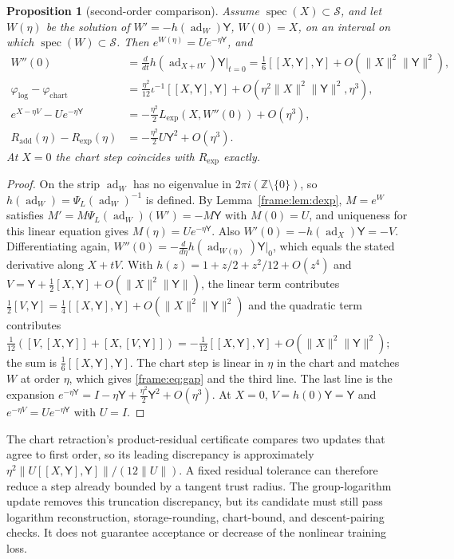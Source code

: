 \documentclass[11pt]{article}
\newtheorem{proposition}[theorem]{Proposition}
\theoremstyle{definition}
\theoremstyle{remark}
\providecommand{\ad}{\operatorname{ad}}
\providecommand{\spec}{\operatorname{spec}}
\begin{document}
\begin{proposition}[second-order comparison]\label{frame:prop:second}
Assume $\spec(X)\subset\mathcal{S}$, and let $W(\eta)$ be the solution of $W'=-h(\ad_W)\mathsf{Y}$, $W(0)=X$, on an interval on which $\spec(W)\subset\mathcal{S}$. Then $e^{W(\eta)}=Ue^{-\eta\mathsf{Y}}$, and
\begin{align}
W''(0)&=\frac{d}{dt}h(\ad_{X+tV})\mathsf{Y}\Big|_{t=0}=\tfrac16[[X,\mathsf{Y}],\mathsf{Y}]+O(\|X\|^2\|\mathsf{Y}\|^2),\label{frame:eq:W2}\\
\varphi_{\log}-\varphi_{\mathrm{chart}}&=\tfrac{\eta^2}{12}\iota^{-1}[[X,\mathsf{Y}],\mathsf{Y}]+O(\eta^2\|X\|^2\|\mathsf{Y}\|^2,\eta^3),\label{frame:eq:gap}\\
e^{X-\eta V}-Ue^{-\eta\mathsf{Y}}&=-\tfrac{\eta^2}{2}L_{\exp}(X,W''(0))+O(\eta^3),\\
R_{\mathrm{add}}(\eta)-R_{\exp}(\eta)&=-\tfrac{\eta^2}{2}U\mathsf{Y}^2+O(\eta^3).
\end{align}
At $X=0$ the chart step coincides with $R_{\exp}$ exactly.
\end{proposition}
\begin{proof}
On the strip $\ad_W$ has no eigenvalue in $2\pi i(\mathbb{Z}\setminus\{0\})$, so $h(\ad_W)=\Psi_L(\ad_W)^{-1}$ is defined. By Lemma~\ref{frame:lem:dexp}, $M=e^{W}$ satisfies $M'=M\Psi_L(\ad_W)(W')=-M\mathsf{Y}$ with $M(0)=U$, and uniqueness for this linear equation gives $M(\eta)=Ue^{-\eta\mathsf{Y}}$. Also $W'(0)=-h(\ad_X)\mathsf{Y}=-V$. Differentiating again, $W''(0)=-\frac{d}{d\eta}h(\ad_{W(\eta)})\mathsf{Y}|_0$, which equals the stated derivative along $X+tV$. With $h(z)=1+z/2+z^2/12+O(z^4)$ and $V=\mathsf{Y}+\frac12[X,\mathsf{Y}]+O(\|X\|^2\|\mathsf{Y}\|)$, the linear term contributes $\frac12[V,\mathsf{Y}]=\frac14[[X,\mathsf{Y}],\mathsf{Y}]+O(\|X\|^2\|\mathsf{Y}\|^2)$ and the quadratic term contributes $\frac1{12}([V,[X,\mathsf{Y}]]+[X,[V,\mathsf{Y}]])=-\frac1{12}[[X,\mathsf{Y}],\mathsf{Y}]+O(\|X\|^2\|\mathsf{Y}\|^2)$; the sum is $\frac16[[X,\mathsf{Y}],\mathsf{Y}]$. The chart step is linear in $\eta$ in the chart and matches $W$ at order $\eta$, which gives \eqref{frame:eq:gap} and the third line. The last line is the expansion $e^{-\eta\mathsf{Y}}=I-\eta\mathsf{Y}+\frac{\eta^2}{2}\mathsf{Y}^2+O(\eta^3)$. At $X=0$, $V=h(0)\mathsf{Y}=\mathsf{Y}$ and $e^{-\eta V}=Ue^{-\eta\mathsf{Y}}$ with $U=I$.
\end{proof}

The chart retraction's product-residual certificate compares two updates that agree to first order, so its leading discrepancy is approximately \(\eta^2\|U[[X,\mathsf{Y}],\mathsf{Y}]\|/(12\|U\|)\). A fixed residual tolerance can therefore reduce a step already bounded by a tangent trust radius. The group-logarithm update removes this truncation discrepancy, but its candidate must still pass logarithm reconstruction, storage-rounding, chart-bound, and descent-pairing checks. It does not guarantee acceptance or decrease of the nonlinear training loss.
\end{document}
